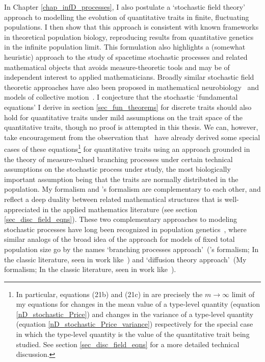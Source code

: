 In Chapter \ref{chap_infD_processes}, I also postulate a `stochastic field theory' approach to modelling the evolution of quantitative traits in finite, fluctuating populations. I then show that this approach is consistent with known frameworks in theoretical population biology, reproducing results from quantitative genetics in the infinite population limit. This formulation also highlights a (somewhat heuristic) approach to the study of spacetime stochastic processes and related mathematical objects that avoids measure-theoretic tools and may be of independent interest to applied mathematicians. Broadly similar stochastic field theoretic approaches have also been proposed in mathematical neurobiology~\citep{buice_field-theoretic_2007,bressloff_stochastic_2010,coombes_neural_2014} and models of collective motion~\citep{o_laighleis_minimal_2018}. I  conjecture that the stochastic `fundamental equations' I derive in section \ref{sec_fun_theorems} for discrete traits should also hold for quantitative traits under mild assumptions on the trait space of the quantitative traits, though no proof is attempted in this thesis. We can, however, take encouragement from the observation that~\cite{week_white_2021} have already derived some special cases of these equations\footnote{In particular, equations (21b) and (21c) in \cite{week_white_2021} are precisely the $m \to \infty$ limit of my equations for changes in the mean value of a type-level quantity (equation \ref{nD_stochastic_Price}) and changes in the variance of a type-level quantity (equation \ref{nD_stochastic_Price_variance}) respectively for the special case in which the type-level quantity is the value of the quantitative trait being studied. See section \ref{sec_disc_field_eqns} for a more detailed technical discussion.} for quantitative traits using an approach grounded in the theory of measure-valued branching processes under certain technical assumptions on the stochastic process under study, the most biologically important assumption being that the traits are normally distributed in the population. My formalism and \cite{week_white_2021}'s formalism are complementary to each other, and reflect a deep duality between related mathematical structures that is well-appreciated in the applied mathematics literature (see section \ref{sec_disc_field_eqns}). These two complementary approaches to modeling stochastic processes have long been recognized in population genetics~\citep{lambert_probability_2006}, where similar analogs of the broad idea of the approach for models of fixed total population size go by the names `branching processes approach'~(\cite{week_white_2021}'s formalism; In the classic literature, seen in work like~\cite{haldane_mathematical_1927,fisher_distribution_1931}) and `diffusion theory approach'~(My formalism; In the classic literature, seen in work like~\cite{wright_evolution_1931,kimura_problems_1957}).
  
